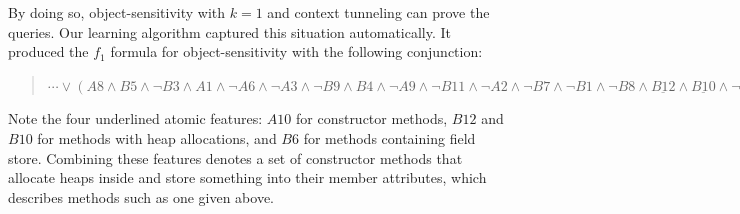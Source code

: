 By doing so, object-sensitivity with $k=1$ and context tunneling can prove the queries.
Our learning algorithm captured this situation automatically.
It produced the $f_1$ formula for object-sensitivity
with the following conjunction:
\begin{quotation}
 $\cdots \lor (A8 \land B5 \land \neg B3 \land A1 \land \neg A6 \land \neg A3 \land \neg B9 \land B4 \land \neg A9 \land \neg B11 \land \neg A2 \land \neg B7 \land \neg B1 \land \neg B8 \land \underline{B12} \land \underline{B10} \land \neg B13 \land \underline{B6} \land A5 \land \underline{A10} \land A7 \land \neg A4)$
\end{quotation}
Note the four underlined atomic features: $A10$ for constructor
methods, $B12$ and $B10$ for methods with heap allocations, and $B6$
for methods containing field store. Combining these features denotes a
set of constructor methods that allocate heaps inside and store
something into their member attributes, which describes methods such
as one given above.  



